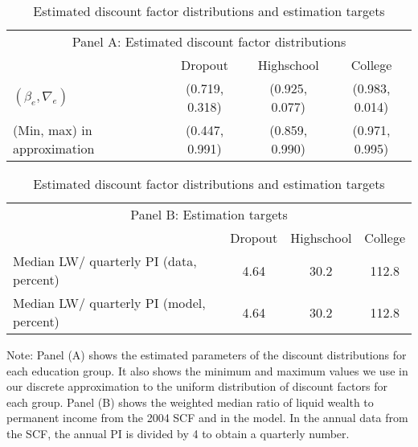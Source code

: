 \documentclass{econsocart}
\begin{document}
\begin{table}[tb] 
  \caption{Estimated discount factor distributions and estimation targets}
  \label{tab:estimBetas} 
  \centering

  \begin{tabular*}
    {\textwidth}{@{\extracolsep{\fill}}lccc@{}}
    \multicolumn{4}{c}{\small Panel A: Estimated discount factor distributions} \\
    \addlinespace
    \hline
    & Dropout & Highschool & College \\ \hline
    $(\beta_e, \nabla_e)$ & (0.719, 0.318) & (0.925, 0.077) & (0.983, 0.014) \\
    (Min, max) in approximation & (0.447, 0.991) & (0.859, 0.990) & (0.971, 0.995) \\
    \hline
  \end{tabular*}

  \vspace{0.5em}

  \begin{tabular*}
    {\textwidth}{@{\extracolsep{\fill}}lccc@{}}
    \multicolumn{4}{c}{\small Panel B: Estimation targets} \\
    \addlinespace
    \hline
    & Dropout & Highschool & College \\ \hline
    Median LW/ quarterly PI (data, percent) & 4.64 & 30.2 & 112.8 \\
    Median LW/ quarterly PI (model, percent) & 4.64 & 30.2 & 112.8 \\
    \hline
  \end{tabular*}

  \noindent\parbox{\textwidth}{
    \medskip
    \footnotesize Note: Panel (A) shows the estimated parameters of the discount distributions for each education group. It also shows the minimum and maximum values we use in our discrete approximation to the uniform distribution of discount factors for each group. Panel (B) shows the weighted median ratio of liquid wealth to permanent income from the 2004 SCF and in the model. In the annual data from the SCF, the annual PI is divided by 4 to obtain a quarterly number.
  }

\end{table}
\end{document}
